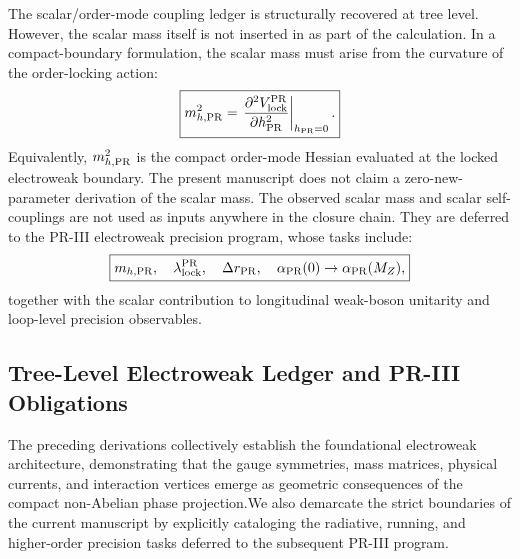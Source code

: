 \documentclass[11pt]{article}
\begin{document}
The scalar/order-mode coupling ledger is structurally recovered at tree level. However, the scalar mass itself is not inserted in as part of the calculation. In a compact-boundary formulation, the scalar mass must arise from the curvature of the order-locking action:
\begin{equation}
\boxed{
m_{h,{\rm PR}}^2
=
\left.
\frac{\partial^2 V_{\rm lock}^{\rm PR}}{\partial h_{\rm PR}^2}
\right|_{h_{\rm PR}=0}.
}
\end{equation}
Equivalently, \(m_{h,{\rm PR}}^2\) is the compact order-mode Hessian evaluated at the locked electroweak boundary. The present manuscript does not claim a zero-new-parameter derivation of the scalar mass. The observed scalar mass and scalar self-couplings are not used as inputs anywhere in the closure chain. They are deferred to the PR-III electroweak precision program, whose tasks include:
\begin{equation}
\boxed{
m_{h,{\rm PR}},\quad \lambda_{\rm lock}^{\rm PR},\quad \Delta r_{\rm PR},\quad \alpha_{\rm PR}(0) \rightarrow \alpha_{\rm PR}(M_Z),
}
\end{equation}
together with the scalar contribution to longitudinal weak-boson unitarity and loop-level precision observables.

\subsection{Tree-Level Electroweak Ledger and PR-III Obligations}
\label{sec:pr2_tree_level_scope}

The preceding derivations collectively establish the foundational electroweak architecture, demonstrating that the gauge symmetries, mass matrices, physical currents, and interaction vertices emerge as geometric consequences of the compact non-Abelian phase projection.We also demarcate the strict boundaries of the current manuscript by explicitly cataloging the radiative, running, and higher-order precision tasks deferred to the subsequent PR-III program.
\end{document}
